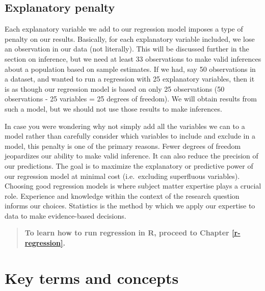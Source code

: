 \documentclass[
]{book}
\begin{document}
\hypertarget{explanatory-penalty}{%
\subsection{Explanatory penalty}\label{explanatory-penalty}}

Each explanatory variable we add to our regression model imposes a type of penalty on our results. Basically, for each explanatory variable included, we lose an observation in our data (not literally). This will be discussed further in the section on inference, but we need at least 33 observations to make valid inferences about a population based on sample estimates. If we had, say 50 observations in a dataset, and wanted to run a regression with 25 explanatory variables, then it is as though our regression model is based on only 25 observations (50 observations - 25 variables = 25 degrees of freedom). We will obtain results from such a model, but we should not use those results to make inferences.

In case you were wondering why not simply add all the variables we can to a model rather than carefully consider which variables to include and exclude in a model, this penalty is one of the primary reasons. Fewer degrees of freedom jeopardizes our ability to make valid inference. It can also reduce the precision of our predictions. The goal is to maximize the explanatory or predictive power of our regression model at minimal cost (i.e.~excluding superfluous variables). Choosing good regression models is where subject matter expertise plays a crucial role. Experience and knowledge within the context of the research question informs our choices. Statistics is the method by which we apply our expertise to data to make evidence-based decisions.

\begin{quote}
\textbf{To learn how to run regression in R, proceed to Chapter \ref{r-regression}.}
\end{quote}

\hypertarget{kt6}{%
\section{Key terms and concepts}\label{kt6}}
\end{document}
